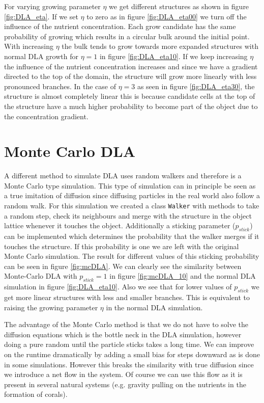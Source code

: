 \documentclass[a4paper]{article}
\begin{document}
For varying growing parameter $\eta$ we get different structures as shown in figure \ref{fig:DLA_eta}. If we set $\eta$ to zero as in figure \ref{fig:DLA_eta00} we turn off the influence of the nutrient concentration. Each grow candidate has the same probability of growing which results in a circular bulk around the initial point. With increasing $\eta$ the bulk tends to grow towards more expanded structures with normal DLA growth for $\eta = 1$ in figure \ref{fig:DLA_eta10}. If we keep increasing $\eta$ the influence of the nutrient concentration increases and since we have a gradient directed to the top of the domain, the structure will grow more linearly with less pronounced branches. In the case of $\eta = 3$ as seen in figure \ref{fig:DLA_eta30}, the structure is almost completely linear this is because candidate cells at the top of the structure have a much higher probability to become part of the object due to the concentration gradient. 



\section{Monte Carlo DLA}
A different method to simulate DLA uses random walkers and therefore is a Monte Carlo type simulation. This type of simulation can in principle be seen as a true imitation of diffusion since diffusing particles in the real world also follow a random walk. For this simulation we created a class \texttt{Walker} with methods to take a random step, check its neighbours and merge with the structure in the object lattice whenever it touches the object. Additionally a sticking parameter ($p_{stick}$) can be implemented which determines the probability that the walker merges if it touches the structure. If this probability is one we are left with the original Monte Carlo simulation. The result for different values of this sticking probability can be seen in figure \ref{fig:mcDLA}. We can clearly see the similarity between Monte-Carlo DLA with $p_{stick} = 1$ in figure \ref{fig:mcDLA_10} and the normal DLA simulation in figure \ref{fig:DLA_eta10}. Also we see that for lower values of $p_{stick}$ we get more linear structures with less and smaller branches. This is equivalent to raising the growing parameter $\eta$ in the normal DLA simulation. 

The advantage of the Monte Carlo method is that we do not have to solve the diffusion equations which is the bottle neck in the DLA simulation, however doing a pure random until the particle sticks takes a long time. We can improve on the runtime dramatically by adding a small bias for steps downward as is done in some simulations. \cite{davies} However this breaks the similarity with true diffusion since we introduce a net flow in the system. Of course we can use this flow as it is present in several natural systems (e.g. gravity pulling on the nutrients in the formation of corals).
\end{document}
